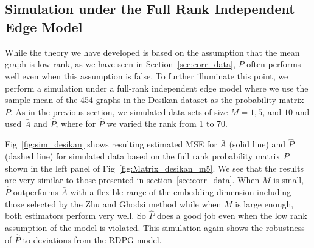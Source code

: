 \documentclass[10pt,letterpaper]{article}
\begin{document}
%
%


\subsection{Simulation under the Full Rank Independent Edge Model}\label{sec:sim_iem}

While the theory we have developed is based on the assumption that the mean graph is low rank, as we have seen in Section~\ref{sec:corr_data}, $\hat{P}$ often performs well even when this assumption is false. 
To further illuminate this point, we perform a simulation under a full-rank independent edge model where we use the sample mean of the 454 graphs in the Desikan dataset as the probability matrix $P$.
As in the previous section, we simulated data sets of size $M=1,5$, and $10$ and used $\bar{A}$ and $\hat{P}$, where for $\hat{P}$ we varied the rank from 1 to 70.

Fig~\ref{fig:sim_desikan} shows resulting estimated MSE for $\bar{A}$ (solid line) and $\hat{P}$ (dashed line) for simulated data based on the full rank probability matrix $P$ shown in the left panel of Fig~\ref{fig:Matrix_desikan_m5}.
We see that the results are very similar to those presented in section~\ref{sec:corr_data}.
When $M$ is small, $\hat{P}$ outperforms $\bar{A}$ with a flexible range of the embedding dimension including those selected by the Zhu and Ghodsi method while when $M$ is large enough, both estimators perform very well.
So $\hat{P}$ does a good job even when the low rank assumption of the model is violated. This simulation again shows the robustness of $\hat{P}$ to deviations from the RDPG model.
\end{document}
